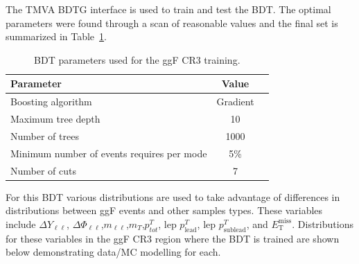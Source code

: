 The TMVA BDTG interface is used to train and test the BDT. The optimal parameters were found through a scan of reasonable values and the final set is summarized in Table~\ref{tab:ggFCR3BDTparameters}.
\begin{table}[h!]
\centering
\begin{tabular}{|l|c|c|}
\hline
Parameter                                    & Value     \\
\hline
Boosting algorithm                           & Gradient \\
Maximum tree depth                           &  10      \\
Number of trees                              &  1000    \\
Minimum number of events requires per mode   &  5\%     \\ 
Number of cuts                               &  7       \\
\hline
\end{tabular}
\caption{BDT parameters used for the ggF CR3 training.}
\label{tab:ggFCR3BDTparameters}
\end{table}
For this BDT various distributions are used to take advantage of differences in distributions between ggF events and other samples types. These variables include $\Delta Y_{\ell\ell}$, $\Delta \Phi_{\ell\ell}$,$m_{\ell\ell}$,$m_T$,$p^T_{tot}$, lep $p^T_{\text{lead}}$, lep $p^T_{\text{sublead}}$, and $\ensuremath{E_{\text{T}}^{\text{miss}}}$. Distributions for these variables in the ggF CR3 region where the BDT is trained are shown below demonstrating data/MC modelling for each.

